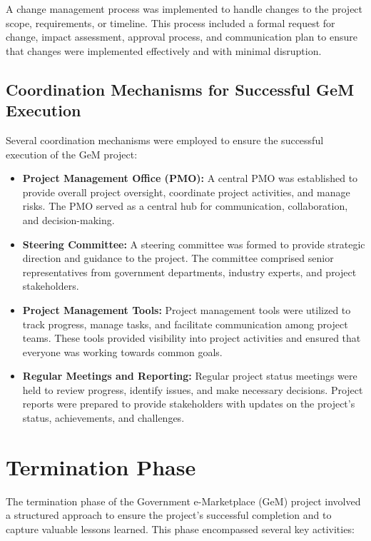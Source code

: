 A change management process was implemented to handle changes to the project scope, requirements, or timeline. This process included a formal request for change, impact assessment, approval process, and communication plan to ensure that changes were implemented effectively and with minimal disruption.


\subsection{Coordination Mechanisms for Successful GeM Execution}

Several coordination mechanisms were employed to ensure the successful execution of the GeM project:

\begin{itemize}
    \item \textbf{Project Management Office (PMO):} A central PMO was established to provide overall project oversight, coordinate project activities, and manage risks. The PMO served as a central hub for communication, collaboration, and decision-making.
    
    \item \textbf{Steering Committee:} A steering committee was formed to provide strategic direction and guidance to the project. The committee comprised senior representatives from government departments, industry experts, and project stakeholders.
    
    \item \textbf{Project Management Tools:} Project management tools were utilized to track progress, manage tasks, and facilitate communication among project teams. These tools provided visibility into project activities and ensured that everyone was working towards common goals.
    
    \item \textbf{Regular Meetings and Reporting:} Regular project status meetings were held to review progress, identify issues, and make necessary decisions. Project reports were prepared to provide stakeholders with updates on the project's status, achievements, and challenges.
\end{itemize}

\section{Termination Phase}

The termination phase of the Government e-Marketplace (GeM) project involved a structured approach to ensure the project's successful completion and to capture valuable lessons learned. This phase encompassed several key activities:

